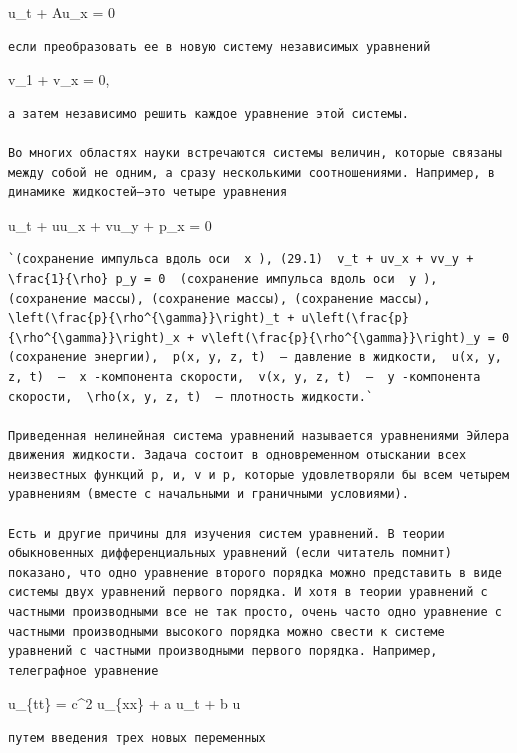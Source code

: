 \documentclass[
  ukrainian,
]{article}
\begin{document}
u\_t + Au\_x = 0

\begin{verbatim}
если преобразовать ее в новую систему независимых уравнений
\end{verbatim}

v\_1 + \Lambda v\_x = 0,

\begin{verbatim}
а затем независимо решить каждое уравнение этой системы.

Во многих областях науки встречаются системы величин, которые связаны между собой не одним, а сразу несколькими соотношениями. Например, в динамике жидкостей—это четыре уравнения
\end{verbatim}

u\_t + uu\_x + vu\_y +  p\_x = 0

\begin{verbatim}
`(сохранение импульса вдоль оси  x ), (29.1)  v_t + uv_x + vv_y + \frac{1}{\rho} p_y = 0  (сохранение импульса вдоль оси  y ), (сохранение массы), (сохранение массы), (сохранение массы),  \left(\frac{p}{\rho^{\gamma}}\right)_t + u\left(\frac{p}{\rho^{\gamma}}\right)_x + v\left(\frac{p}{\rho^{\gamma}}\right)_y = 0  (сохранение энергии),  p(x, y, z, t)  — давление в жидкости,  u(x, y, z, t)  —  x -компонента скорости,  v(x, y, z, t)  —  y -компонента скорости,  \rho(x, y, z, t)  — плотность жидкости.`

Приведенная нелинейная система уравнений называется уравнениями Эйлера движения жидкости. Задача состоит в одновременном отыскании всех неизвестных функций р, и, v и р, которые удовлетворяли бы всем четырем уравнениям (вместе с начальными и граничными условиями).

Есть и другие причины для изучения систем уравнений. В теории обыкновенных дифференциальных уравнений (если читатель помнит) показано, что одно уравнение второго порядка можно представить в виде системы двух уравнений первого порядка. И хотя в теории уравнений с частными производными все не так просто, очень часто одно уравнение с частными производными высокого порядка можно свести к системе уравнений с частными производными первого порядка. Например, телеграфное уравнение
\end{verbatim}

u\_\{tt\} = c\^{}2 u\_\{xx\} + a u\_t + b u

\begin{verbatim}
путем введения трех новых переменных
\end{verbatim}
\end{document}
